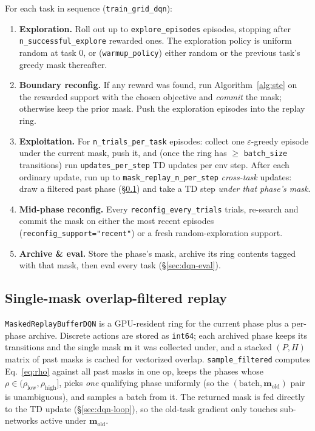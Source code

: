 \documentclass[11pt]{article}
\newcommand{\mask}{\bm{m}}                 %
\newcommand{\Ho}{H}                        %
\newcommand{\code}[1]{\texttt{\small #1}}
\begin{document}
For each task in sequence (\code{train\_grid\_dqn}):
\begin{enumerate}[leftmargin=2em,itemsep=1pt]
  \item \textbf{Exploration.} Roll out up to \code{explore\_episodes} episodes,
  stopping after \code{n\_successful\_explore} rewarded ones. The exploration
  policy is uniform random at task 0, or (\code{warmup\_policy}) either random or
  the previous task's greedy mask thereafter.
  \item \textbf{Boundary reconfig.} If any reward was found, run
  Algorithm~\ref{alg:ste} on the rewarded support with the chosen objective and
  \emph{commit} the mask; otherwise keep the prior mask. Push the exploration
  episodes into the replay ring.
  \item \textbf{Exploitation.} For \code{n\_trials\_per\_task} episodes: collect
  one $\varepsilon$-greedy episode under the current mask, push it, and (once the
  ring has $\ge$ \code{batch\_size} transitions) run \code{updates\_per\_step} TD
  updates per env step. After each ordinary update, run up to
  \code{mask\_replay\_n\_per\_step} \emph{cross-task} updates: draw a filtered
  past phase (\S\ref{sec:dqn-replay}) and take a TD step \emph{under that phase's
  mask}.
  \item \textbf{Mid-phase reconfig.} Every \code{reconfig\_every\_trials} trials,
  re-search and commit the mask on either the most recent episodes
  (\code{reconfig\_support="recent"}) or a fresh random-exploration support.
  \item \textbf{Archive \& eval.} Store the phase's mask, archive its ring
  contents tagged with that mask, then eval every task (\S\ref{sec:dqn-eval}).
\end{enumerate}

\subsection{Single-mask overlap-filtered replay}
\label{sec:dqn-replay}

\code{MaskedReplayBufferDQN} is a GPU-resident ring for the current phase plus a
per-phase archive. Discrete actions are stored as \code{int64}; each archived
phase keeps its transitions and the single mask $\mask$ it was collected under, and
a stacked $(P,\Ho)$ matrix of past masks is cached for vectorized overlap.
\code{sample\_filtered} computes Eq.~\eqref{eq:rho} against all past masks in one
op, keeps the phases whose $\rho\in(\rho_{\mathrm{low}},\rho_{\mathrm{high}}]$,
picks \emph{one} qualifying phase uniformly (so the $(\text{batch},
\mask_{\mathrm{old}})$ pair is unambiguous), and samples a batch from it. The
returned mask is fed directly to the TD update (\S\ref{sec:dqn-loop}), so the
old-task gradient only touches sub-networks active under $\mask_{\mathrm{old}}$.
\end{document}
